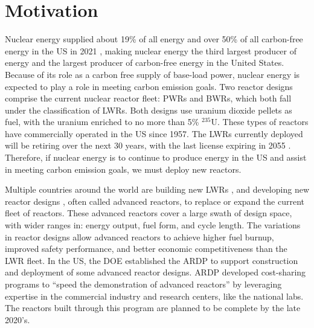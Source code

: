 \section{Motivation}
Nuclear energy supplied about 19\% of all energy and over 50\%  
of all carbon-free energy in the US in 2021 
\cite{energy_information_administration_electricity_2022}, making nuclear 
energy the third largest producer of energy and the largest 
producer of carbon-free energy in the United States. Because of its role 
as a carbon free supply of base-load power, nuclear energy is expected 
to play a role in meeting carbon emission goals. Two reactor designs 
comprise the current nuclear reactor fleet: \glspl{PWR} and \glspl{BWR}, 
which both fall under the classification of \glspl{LWR}.
Both designs use uranium dioxide pellets as fuel, with the uranium 
enriched to no more than 5\% $^{235}$U. These types of reactors 
have commercially operated in the US since 1957. The \glspl{LWR} 
currently deployed will be retiring over the next 30 years, with the 
last license expiring in 2055 \cite{nei_us_2021}. Therefore, if 
nuclear energy is to continue to produce energy in the US 
and assist in meeting carbon emission goals, we must deploy new reactors. 

Multiple countries around the world are building new \glspl{LWR}
\cite{world_nuclear_association_plans_2022}, and developing
new reactor designs \cite{hussain_advances_2018}, often called 
advanced reactors, to 
replace or expand the current fleet of reactors. These advanced reactors 
cover a large swath of design space, with wider ranges in: energy output, 
fuel form, and cycle length. The variations in reactor designs allow 
advanced reactors to achieve higher fuel burnup, improved safety 
performance, and better economic competitiveness than the \gls{LWR} fleet. 
In the US, the \gls{DOE} established the \gls{ARDP} 
\cite{us_department_of_energy_office_of_nuclear_energy_advanced_nodate}
to support construction and deployment of some advanced reactor designs. 
\gls{ARDP} developed cost-sharing programs to ``speed the demonstration of 
advanced reactors'' 
\cite{us_department_of_energy_office_of_nuclear_energy_advanced_nodate}
by leveraging expertise in the commercial industry and research centers, 
like the national labs. The reactors built through this program 
are planned to be complete by the late 2020's.

